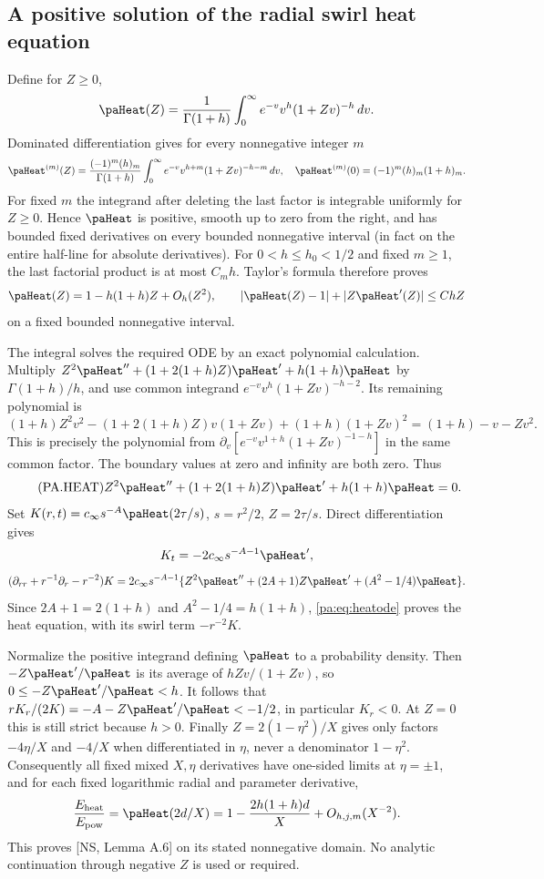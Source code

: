\documentclass[10pt,a4paper]{article}
\begin{document}
\subsection{A positive solution of the radial swirl heat equation}
Define for $Z\ge0$,
\[
\paHeat(Z)=\frac1{\Gamma(1+h)}\int_0^\infty e^{-v}v^h(1+Zv)^{-h}\,dv.
\]
Dominated differentiation gives for every nonnegative integer $m$
\[
\paHeat^{(m)}(Z)=\frac{(-1)^m(h)_m}{\Gamma(1+h)}
\int_0^\infty e^{-v}v^{h+m}(1+Zv)^{-h-m}\,dv,
\quad \paHeat^{(m)}(0)=(-1)^m(h)_m(1+h)_m.
\]
For fixed $m$ the integrand after deleting the last factor is integrable
uniformly for $Z\ge0$. Hence $\paHeat$ is positive, smooth up to zero from the
right, and has bounded fixed derivatives on every bounded nonnegative interval
(in fact on the entire half-line for absolute derivatives).
For $0<h\le h_0<1/2$ and fixed $m\ge1$, the last factorial product is at
most $C_mh$. Taylor's formula therefore proves
\[
\paHeat(Z)=1-h(1+h)Z+O_h(Z^2),\qquad
|\paHeat(Z)-1|+|Z\paHeat'(Z)|\le C hZ
\]
on a fixed bounded nonnegative interval.

The integral solves the required ODE by an exact polynomial calculation.
Multiply
$Z^2\paHeat''+(1+2(1+h)Z)\paHeat'+h(1+h)\paHeat$
by $\Gamma(1+h)/h$, and use common integrand
$e^{-v}v^h(1+Zv)^{-h-2}$. Its remaining polynomial is
\[
(1+h)Z^2v^2-(1+2(1+h)Z)v(1+Zv)+(1+h)(1+Zv)^2
=(1+h)-v-Zv^2.
\]
This is precisely the polynomial from
$\partial_v[e^{-v}v^{1+h}(1+Zv)^{-1-h}]$ in the same common factor.
The boundary values at zero and infinity are both zero. Thus
\begin{equation}\label{pa:eq:heatode}\tag{PA.HEAT}
Z^2\paHeat''+(1+2(1+h)Z)\paHeat'+h(1+h)\paHeat=0.
\end{equation}
Set $K(r,t)=c_\infty s^{-A}\paHeat(2\tau/s)$, $s=r^2/2$, $Z=2\tau/s$.
Direct differentiation gives
\[
K_t=-2c_\infty s^{-A-1}\paHeat',
\]
\[
(\partial_{rr}+r^{-1}\partial_r-r^{-2})K
=2c_\infty s^{-A-1}
\{Z^2\paHeat''+(2A+1)Z\paHeat'+(A^2-1/4)\paHeat\}.
\]
Since $2A+1=2(1+h)$ and $A^2-1/4=h(1+h)$,
\eqref{pa:eq:heatode} proves the heat equation, with its swirl term $-r^{-2}K$.

Normalize the positive integrand defining $\paHeat$ to a probability density.
Then $-Z\paHeat'/\paHeat$ is its average of $hZv/(1+Zv)$, so
$0\le-Z\paHeat'/\paHeat<h$. It follows that
$rK_r/(2K)=-A-Z\paHeat'/\paHeat<-1/2$, in particular $K_r<0$.
At $Z=0$ this is still strict because $h>0$.
Finally $Z=2(1-\eta^2)/X$ gives only factors $-4\eta/X$ and $-4/X$
when differentiated in $\eta$, never a denominator $1-\eta^2$.
Consequently all fixed mixed $X,\eta$ derivatives have one-sided limits at
$\eta=\pm1$, and for each fixed logarithmic radial and parameter derivative,
\[
\frac{E_{\rm heat}}{E_{\rm pow}}
=\paHeat(2d/X)=1-\frac{2h(1+h)d}{X}+O_{h,j,m}(X^{-2}).
\]
This proves [NS, Lemma A.6] on its stated nonnegative domain. No analytic
continuation through negative $Z$ is used or required.
\end{document}
